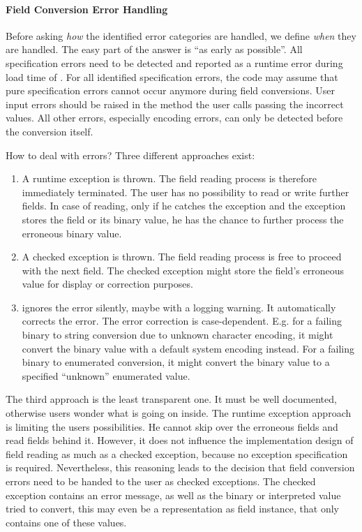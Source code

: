 \paragraph{Field Conversion Error Handling}
\label{sec:FieldConversionErrorHandling}

Before asking \emph{how} the identified error categories are handled, we define \emph{when} they are handled. The easy part of the answer is ``as early as possible''. All specification errors need to be detected and reported as a runtime error during load time of \LibName{}. For all identified specification errors, the \LibName{} code may assume that pure specification errors cannot occur anymore during field conversions. User input errors should be raised in the method the user calls passing the incorrect values. All other errors, especially encoding errors, can only be detected before the conversion itself.

How to deal with errors? Three different approaches exist:
\begin{enumerate}
	\item A runtime exception is thrown. The field reading process is therefore immediately terminated. The user has no possibility to read or write further fields. In case of reading, only if he catches the exception and the exception stores the field or its binary value, he has the chance to further process the erroneous binary value.
	\item A checked exception is thrown. The field reading process is free to proceed with the next field. The checked exception might store the field's erroneous value for display or correction purposes.
	\item \LibName{} ignores the error silently, maybe with a logging warning. It automatically corrects the error. The error correction is case-dependent. E.g. for a failing binary to string conversion due to unknown character encoding, it might convert the binary value with a default system encoding instead. For a failing binary to enumerated conversion, it might convert the binary value to a specified ``unknown'' enumerated value.
\end{enumerate}

The third approach is the least transparent one. It must be well documented, otherwise users wonder what is going on inside. The runtime exception approach is limiting the users possibilities. He cannot skip over the erroneous fields and read fields behind it. However, it does not influence the implementation design of field reading as much as a checked exception, because no exception specification is required. Nevertheless, this reasoning leads to the decision that field conversion errors need to be handed to the user as checked exceptions. The checked exception contains an error message, as well as the binary or interpreted value tried to convert, this may even be a representation as field instance, that only contains one of these values.

